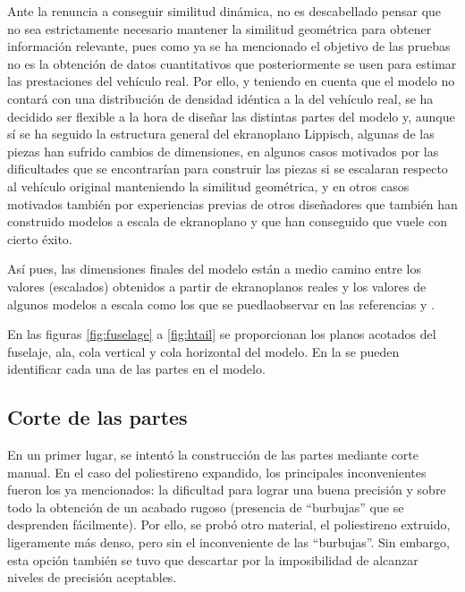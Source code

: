 Ante la renuncia a conseguir similitud dinámica, no es descabellado pensar que no sea estrictamente necesario mantener la similitud geométrica para obtener información relevante, pues como ya se ha mencionado el objetivo de las pruebas no es la obtención de datos cuantitativos que posteriormente se usen para estimar las prestaciones del vehículo real. Por ello, y teniendo en cuenta que el modelo no contará con una distribución de densidad idéntica a la del vehículo real, se ha decidido ser flexible a la hora de diseñar las distintas partes del modelo y, aunque sí se ha seguido la estructura general del ekranoplano Lippisch, algunas de las piezas han sufrido cambios de dimensiones, en algunos casos motivados por las dificultades que se encontrarían para construir las piezas si se escalaran respecto al vehículo original manteniendo la similitud geométrica, y en otros casos motivados también por experiencias previas de otros diseñadores que también han construido modelos a escala de ekranoplano y que han conseguido que vuele con cierto éxito.

Así pues, las dimensiones finales del modelo están a medio camino entre los valores (escalados) obtenidos a partir de ekranoplanos reales y los valores de algunos modelos a escala como los que se puedlaobservar en las referencias \cite{ref:youtubegev} y \cite{ref:youtubedelta2}.

En las figuras \ref{fig:fuselage} a \ref{fig:htail} se proporcionan los planos acotados del fuselaje, ala, cola vertical y cola horizontal del modelo. En la  se pueden identificar cada una de las partes en el modelo. 



\subsection{Corte de las partes}
\label{sec:building:technique}

En un primer lugar, se intentó la construcción de las partes mediante corte manual. En el caso del poliestireno expandido, los principales inconvenientes fueron los ya mencionados: la dificultad para lograr una buena precisión y sobre todo la obtención de un acabado rugoso (presencia de “burbujas” que se desprenden fácilmente). Por ello, se probó otro material, el poliestireno extruido, ligeramente más denso\cite{ref:poliestirenoextruido}, pero sin el inconveniente de las “burbujas”. Sin embargo, esta opción también se tuvo que descartar por la imposibilidad de alcanzar niveles de precisión aceptables.

